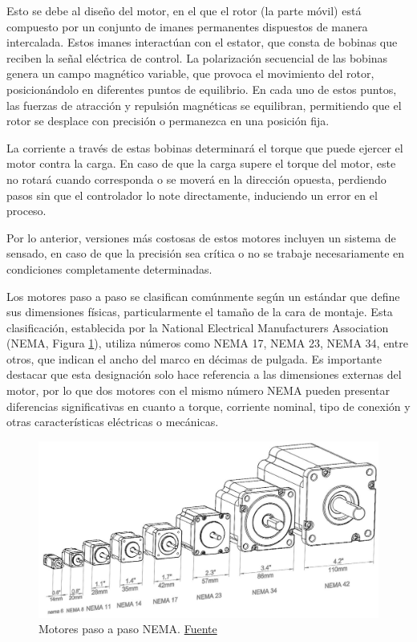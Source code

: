 Esto se debe al diseño del motor, en el que el rotor (la parte móvil) está compuesto por un conjunto de imanes permanentes dispuestos de manera intercalada. Estos imanes interactúan con el estator, que consta de bobinas que reciben la señal eléctrica de control. La polarización secuencial de las bobinas genera un campo magnético variable, que provoca el movimiento del rotor, posicionándolo en diferentes puntos de equilibrio. En cada uno de estos puntos, las fuerzas de atracción y repulsión magnéticas se equilibran, permitiendo que el rotor se desplace con precisión o permanezca en una posición fija.

La corriente a través de estas bobinas determinará el torque que puede ejercer el motor contra la carga. En caso de que la carga supere el torque del motor, este no rotará cuando corresponda o se moverá en la dirección opuesta, perdiendo pasos sin que el controlador lo note directamente, induciendo un error en el proceso.

Por lo anterior, versiones más costosas de estos motores incluyen un sistema de sensado, en caso de que la precisión sea crítica o no se trabaje necesariamente en condiciones completamente determinadas.

Los motores paso a paso se clasifican comúnmente según un estándar que define sus dimensiones físicas, particularmente el tamaño de la cara de montaje. Esta clasificación, establecida por la National Electrical Manufacturers Association (NEMA, Figura \ref{nmas}), utiliza números como NEMA 17, NEMA 23, NEMA 34, entre otros, que indican el ancho del marco en décimas de pulgada. Es importante destacar que esta designación solo hace referencia a las dimensiones externas del motor, por lo que dos motores con el mismo número NEMA pueden presentar diferencias significativas en cuanto a torque, corriente nominal, tipo de conexión y otras características eléctricas o mecánicas.

\begin{figure}[h!]
    \centering
    \includegraphics[width=0.9\linewidth]{imgs/nemas.png}
    \caption{Motores paso a paso NEMA. \href{https://www.stepperonline.co.uk/stepper-motors.html}{Fuente}}
    \label{nmas}
\end{figure}


